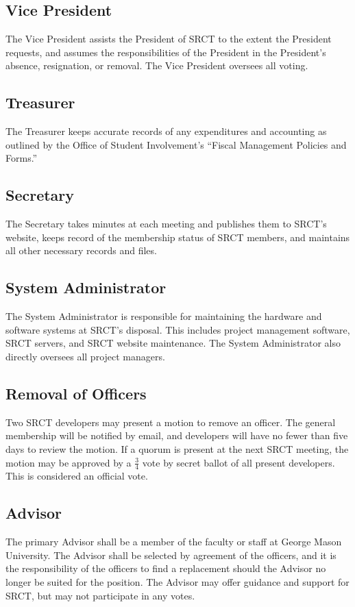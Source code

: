\documentclass{article}
\begin{document}
  \subsection{Vice President}
  The Vice President assists the President of SRCT to the extent the 
  President requests, and assumes the responsibilities of the President 
  in the President's absence, resignation, or removal. The Vice 
  President oversees all voting.
  
  \subsection{Treasurer}
  The Treasurer keeps accurate records of any expenditures and 
  accounting as outlined by the Office of Student Involvement's 
  ``Fiscal Management Policies and Forms.''
  
  \subsection{Secretary}
  The Secretary takes minutes at each meeting and publishes them to 
  SRCT's website, keeps record of the membership status of SRCT members, 
  and maintains all other necessary records and files.
  
  \subsection{System Administrator}
  The System Administrator is responsible for maintaining the hardware 
  and software systems at SRCT's disposal. This includes project 
  management software, SRCT servers, and SRCT website maintenance. The
  System Administrator also directly oversees all project managers.

  \subsection{Removal of Officers}
  Two SRCT developers may present a motion to remove an officer. The general
  membership will be notified by email, and developers will have no fewer
  than five days to review the motion. If a quorum is present at the next
  SRCT meeting, the motion may be approved by a $\frac{3}{4}$ vote by secret 
  ballot of all present developers. This is considered an official vote.
  
  \subsection{Advisor}
  The primary Advisor shall be a member of the faculty or staff at 
  George Mason University. The Advisor shall be selected by agreement of 
  the officers, and it is the responsibility of the officers to find a
  replacement should the Advisor no longer be suited for the position.
  The Advisor may offer guidance and support for SRCT, but may not 
  participate in any votes.
  
\end{document}

